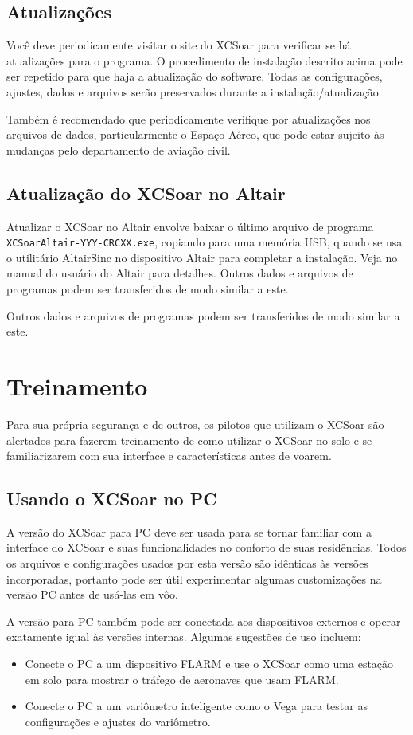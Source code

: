 \subsection*{Atualizações}
Você deve periodicamente visitar o site do XCSoar para verificar se há atualizações para o programa.  O procedimento de instalação descrito acima pode ser repetido para que haja a atualização do software.  Todas as configurações, ajustes, dados e arquivos serão preservados durante a instalação/atualização.

Também é recomendado que periodicamente verifique por atualizações nos arquivos de dados, particularmente o Espaço Aéreo, que pode estar sujeito às mudanças pelo departamento de aviação civil.

\subsection*{Atualização do XCSoar no Altair}
Atualizar o XCSoar no Altair envolve baixar o último arquivo de programa {\tt XCSoarAltair-YYY-CRCXX.exe}, copiando para uma memória USB, quando se usa o utilitário AltairSinc no dispositivo Altair para completar a instalação.  Veja no manual do usuário do Altair para detalhes.
Outros dados e arquivos de programas podem ser transferidos de modo similar a este.

Outros dados e arquivos de programas podem ser transferidos de modo similar a este.

\section{Treinamento}
Para sua própria segurança e de outros, os pilotos que utilizam o XCSoar são alertados para fazerem treinamento de como utilizar o XCSoar no solo e se familiarizarem com sua interface e características antes de voarem.

\subsection*{Usando o XCSoar no PC}
A versão do XCSoar para PC deve ser usada para se tornar familiar com a interface do XCSoar e suas funcionalidades no conforto de suas residências.  Todos os arquivos e configurações usados por esta versão são idênticas às versões incorporadas, portanto pode ser útil experimentar algumas customizações na versão PC antes de usá-las em vôo.

A versão para PC também pode ser conectada aos dispositivos externos e operar exatamente igual às versões internas.  Algumas sugestões de uso incluem:
\begin{itemize}
\item Conecte o PC a um dispositivo FLARM e use o XCSoar como uma estação em solo para mostrar o tráfego de aeronaves que usam FLARM.
\item Conecte o PC a um variômetro inteligente como o Vega para testar as configurações e ajustes do variômetro.
\end{itemize}

